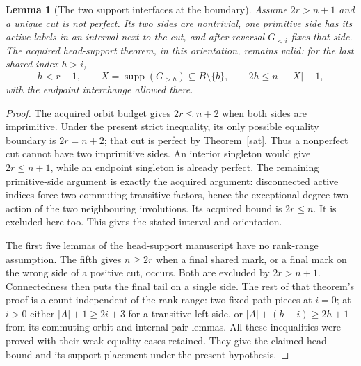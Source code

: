 \documentclass[11pt,a4paper]{article}
\newtheorem{lemma}{Lemma}
\begin{document}
\begin{lemma}[The two support interfaces at the boundary]\label{interfaces}
Assume $2r>n+1$ and a unique cut is not perfect. Its two sides
are nontrivial, one primitive side has its active labels in
an interval next to the cut, and after reversal $G_{<i}$
fixes that side. The acquired head-support theorem, in this
orientation, remains valid: for the last shared index $h>i$,
\[
 h<r-1,\qquad X=\operatorname{supp}(G_{>h})
 \subseteq B\setminus\{b\},\qquad 2h\le n-|X|-1,
\]
with the endpoint interchange allowed there.
\end{lemma}
\begin{proof}
The acquired orbit budget gives $2r\le n+2$ when both
sides are imprimitive. Under the present strict inequality,
its only possible equality boundary is $2r=n+2$; that cut
is perfect by Theorem~\ref{sat}. Thus a nonperfect cut
cannot have two imprimitive sides. An interior singleton
would give $2r\le n+1$, while an endpoint singleton is
already perfect. The remaining primitive-side argument is
exactly the acquired argument: disconnected active indices
force two commuting transitive factors, hence the exceptional
degree-two action of the two neighbouring involutions.
Its acquired bound is $2r\le n$. It is excluded here too.
This gives the stated interval and orientation.

The first five lemmas of the head-support manuscript have
no rank-range assumption. The fifth gives $n\ge2r$ when
a final shared mark, or a final mark on the wrong side of
a positive cut, occurs. Both are excluded by $2r>n+1$.
Connectedness then puts the final tail on a single side.
The rest of that theorem's proof is a count independent of
the rank range: two fixed path pieces at $i=0$; at $i>0$
either $|A|+1\ge2i+3$ for a transitive left side, or
$|A|+(h-i)\ge2h+1$ from its commuting-orbit and internal-pair
lemmas. All these inequalities were proved with their weak
equality cases retained. They give the claimed head bound
and its support placement under the present hypothesis.
\end{proof}
\end{document}
